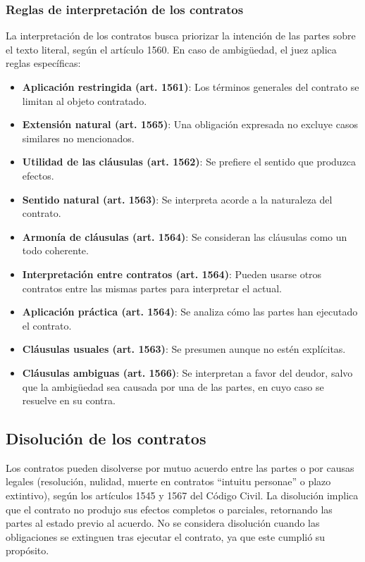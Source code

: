 \documentclass{templateNote}
\begin{document}
\subsubsection{Reglas de interpretación de los contratos}
La interpretación de los contratos busca priorizar la intención de las partes sobre el texto literal, según el artículo 1560. En caso de ambigüedad, el juez aplica reglas específicas:

\begin{itemize}
    \item \textbf{Aplicación restringida (art. 1561)}: Los términos generales del contrato se limitan al objeto contratado.
    \item \textbf{Extensión natural (art. 1565)}: Una obligación expresada no excluye casos similares no mencionados.
    \item \textbf{Utilidad de las cláusulas (art. 1562)}: Se prefiere el sentido que produzca efectos.
    \item \textbf{Sentido natural (art. 1563)}: Se interpreta acorde a la naturaleza del contrato.
    \item \textbf{Armonía de cláusulas (art. 1564)}: Se consideran las cláusulas como un todo coherente.
    \item \textbf{Interpretación entre contratos (art. 1564)}: Pueden usarse otros contratos entre las mismas partes para interpretar el actual.
    \item \textbf{Aplicación práctica (art. 1564)}: Se analiza cómo las partes han ejecutado el contrato.
    \item \textbf{Cláusulas usuales (art. 1563)}: Se presumen aunque no estén explícitas.
    \item \textbf{Cláusulas ambiguas (art. 1566)}: Se interpretan a favor del deudor, salvo que la ambigüedad sea causada por una de las partes, en cuyo caso se resuelve en su contra.
\end{itemize}

\subsection{Disolución de los contratos}
Los contratos pueden disolverse por mutuo acuerdo entre las partes o por causas legales (resolución, nulidad, muerte en contratos ``intuitu personae'' o plazo extintivo), según los artículos 1545 y 1567 del Código Civil. La disolución implica que el contrato no produjo sus efectos completos o parciales, retornando las partes al estado previo al acuerdo. No se considera disolución cuando las obligaciones se extinguen tras ejecutar el contrato, ya que este cumplió su propósito.
\end{document}
